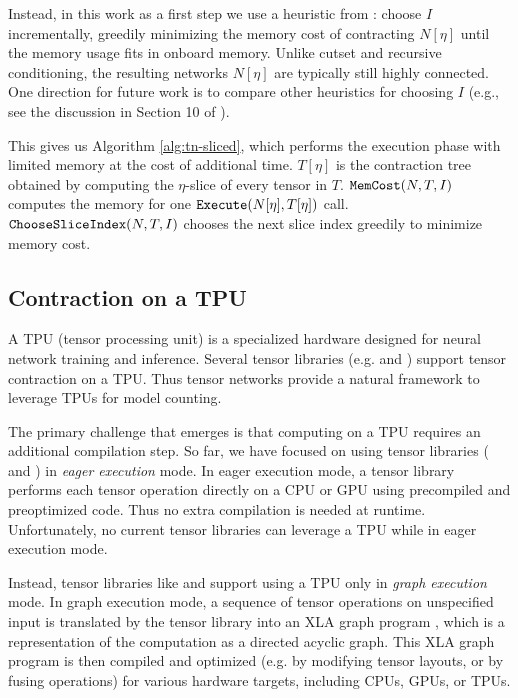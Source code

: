 Instead, in this work as a first step we use a heuristic from \cite{CZHNS18,GK20}: choose $I$ incrementally, greedily minimizing the memory cost of contracting $N[\eta]$ until the memory usage fits in onboard memory. Unlike cutset and recursive conditioning, the resulting networks $N[\eta]$ are typically still highly connected. One direction for future work is to compare other heuristics for choosing $I$ (e.g., see the discussion in Section 10 of \cite{dechter99}).

This gives us Algorithm \ref{alg:tn-sliced}, which performs the execution phase with limited memory at the cost of additional time. $T[\eta]$ is the contraction tree obtained by computing the $\eta$-slice of every tensor in $T$. $\texttt{\upshape MemCost}(N, T, I)$ computes the memory for one $\texttt{\upshape Execute}(N[\eta], T[\eta])$ call. $\texttt{\upshape ChooseSliceIndex}(N,T,I)$ chooses the next slice index greedily to minimize memory cost.

\subsection{Contraction on a TPU}
\label{sec:parallel:execution:tpu}
A TPU (tensor processing unit) \cite{JYPPABBBBB17} is a specialized hardware designed for neural network training and inference. %
Several tensor libraries (e.g.  \cite{ABCCDDDGII16} and  \cite{jax2018github}) support tensor contraction on a TPU.
Thus tensor networks provide a natural framework to leverage TPUs for model counting.

The primary challenge that emerges is that computing on a TPU requires an additional compilation step.
So far, we have focused on using tensor libraries ( \cite{numpy} and  \cite{ABCCDDDGII16}) in \emph{eager execution} mode.
In eager execution mode, a tensor library performs each tensor operation directly on a CPU or GPU using precompiled and preoptimized code.
Thus no extra compilation is needed at runtime.
Unfortunately, no current tensor libraries can leverage a TPU while in eager execution mode.

Instead, tensor libraries like  \cite{ABCCDDDGII16} and  \cite{jax2018github} support using a TPU only in \emph{graph execution} mode. 
In graph execution mode, a sequence of tensor operations on unspecified input is translated by the tensor library into an XLA graph program \cite{XLA}, which is a representation of the computation as a directed acyclic graph. 
This XLA graph program is then compiled and optimized (e.g. by modifying tensor layouts, or by fusing operations) for various hardware targets, including CPUs, GPUs, or TPUs. 

